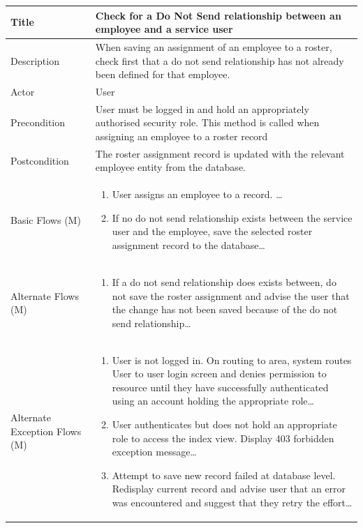 \documentclass[a4paper,12pt]{article}
\newcommand\addrow[2]{#1 &#2\\ }
\newcommand\addheading[2]{#1 &#2\\ \hline}
\newcommand\tabularhead{\begin{tabular}{lp{11cm}}
\hline
}
\newcommand\addmulrow[2]{ \begin{minipage}[t][][t]{3cm}#1\end{minipage}%
   &\begin{minipage}[t][][t]{11cm}
    \begin{enumerate} #2   \end{enumerate}
    \end{minipage}\\ }
\newenvironment{usecase}{\tabularhead}
{\hline\end{tabular}}
\begin{document}
\begin{samepage}
\begin{usecase}
    \addheading{Title}{Check for a Do Not Send relationship between an employee and a service user}
  \addheading{Description}{When saving an assignment of an employee to a roster, check first that a do not send relationship has not already been defined for that employee.}
  \addheading{Actor}{User} 
  \addrow{Precondition}{User must be logged in and hold an appropriately authorised security role. This method is called when assigning an employee to a roster record}
  \addrow{Postcondition}{The roster assignment record is updated with the relevant employee entity from the database.}
  \addmulrow{Basic Flows (M)}{\item User assigns an employee to a record. \ldots
  \item If no do not send relationship exists between the service user and the employee, save the selected roster assignment record to the database\ldots}
  \addmulrow{Alternate  Flows (M)}{\item If a do not send relationship does exists between, do not save the roster assignment and advise the user that the change has not been saved because of the do not send relationship\ldots}
  \addmulrow{Alternate Exception Flows (M)}{\item User is not logged in. On routing to area, system routes User to user login screen and denies permission to resource until they have successfully authenticated using an account holding the appropriate role\ldots
                                                                      \item User authenticates but does not hold an appropriate role to access the index view. Display 403 forbidden exception message\ldots
                                                                      \item Attempt to save new record failed at database level. Redisplay current record and advise user that an error was encountered and suggest that they retry the effort\ldots}

\end{usecase}


\end{samepage}
\end{document}

